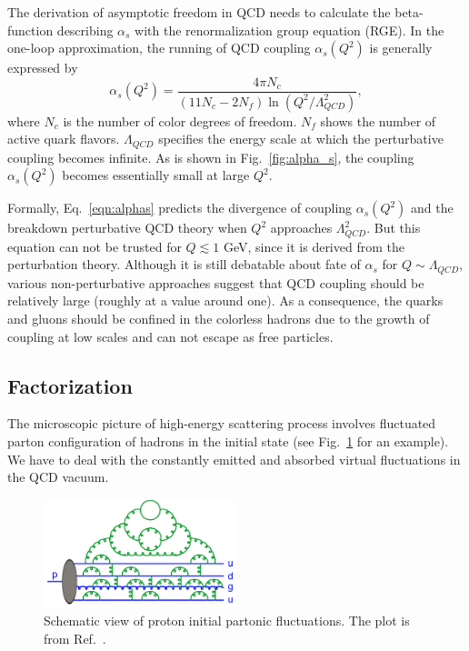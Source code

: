 The derivation of asymptotic freedom in QCD needs to calculate the beta-function
describing $\alpha_{s}$ with the renormalization group equation (RGE). In the
one-loop approximation, the running of QCD coupling $\alpha_{s}(Q^{2})$ is
generally expressed by~\cite{Collins:1987pm}
\begin{equation}
\alpha_{s}(Q^{2})=\frac{4\pi N_{c}}{(11N_{c}-2N_{f})\ln(Q^{2}/\Lambda^{2}_{QCD})},
\label{eqn:alphas}
\end{equation}
where $N_{c}$ is the number of color degrees of freedom. $N_{f}$ shows the
number of active quark flavors. $\Lambda_{QCD}$ specifies the energy scale at
which the perturbative coupling becomes infinite. As is shown in
Fig.~\ref{fig:alpha_s}, the coupling $\alpha_{s}(Q^{2})$ becomes essentially
small at large $Q^{2}$.

Formally, Eq.~\ref{eqn:alphas} predicts the divergence of coupling
$\alpha_{s}(Q^{2})$ and the breakdown perturbative QCD theory when $Q^{2}$
approaches $\Lambda^{2}_{QCD}$. But this equation can not be trusted for
$Q\lesssim 1$ GeV, since it is derived from the perturbation theory. Although it
is still debatable about fate of $\alpha_{s}$ for $Q\sim\Lambda_{QCD}$, various
non-perturbative approaches suggest that QCD coupling should be relatively large
(roughly at a value around one). As a consequence, the quarks and gluons should
be confined in the colorless hadrons due to the growth of coupling at low scales
and can not escape as free particles.


\subsection{Factorization}
The microscopic picture of high-energy scattering process involves fluctuated
parton configuration of hadrons in the initial state (see
Fig.~\ref{fig:hadron_config} for an example). We have to deal with the
constantly emitted and absorbed virtual fluctuations in the QCD vacuum. 

\begin{figure}
\centering
\includegraphics[width=0.5\textwidth]{plots/chpt2/hadron_initial_state.png}
\caption[Schematic view of proton initial state parton configurations] {
Schematic view of proton initial partonic fluctuations. The plot is from Ref.~\cite{Skands:2012ts}. }
\label{fig:hadron_config}
\end{figure}


